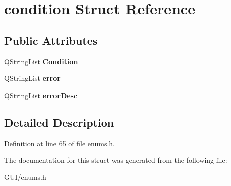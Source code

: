\hypertarget{structcondition}{}\section{condition Struct Reference}
\label{structcondition}
\subsection*{Public Attributes}
\begin{DoxyCompactItemize}
\item 
\mbox{\label{structcondition_a6a4040d35c8e8407d7aed9cdebce1029}} 
Q\+String\+List {\bfseries Condition}
\item 
\mbox{\label{structcondition_aa045a3e8a61b961470ec4eb963e12248}} 
Q\+String\+List {\bfseries error}
\item 
\mbox{\label{structcondition_ad29d3685222176d08cbdf5d29fba89ec}} 
Q\+String\+List {\bfseries error\+Desc}
\end{DoxyCompactItemize}


\subsection{Detailed Description}


Definition at line 65 of file enums.\+h.



The documentation for this struct was generated from the following file\+:\begin{DoxyCompactItemize}
\item 
G\+U\+I/enums.\+h\end{DoxyCompactItemize}
